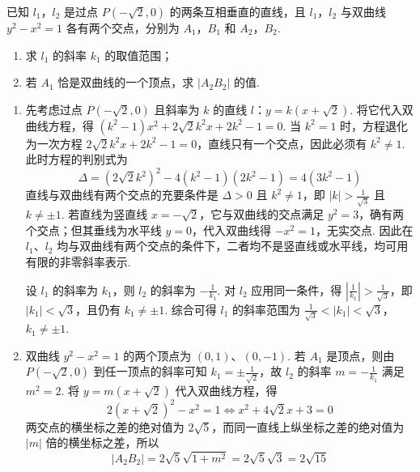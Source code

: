 \documentclass[UTF8,a4paper,oneside,11pt]{ctexbook}
\begin{document}
\begin{problem}
已知 \(l_{1}\)，\(l_{2}\) 是过点 \(P\left(-\sqrt{2}, 0\right)\) 的两条互相垂直的直线，且 \(l_{1}\)，\(l_{2}\) 与双曲线 \(y^{2}-x^{2}=1\) 各有两个交点，分别为 \(A_{1}\)，\(B_{1}\) 和 \(A_{2}\)，\(B_{2}\).

\begin{enumerate}
\item 求 \(l_{1}\) 的斜率 \(k_{1}\) 的取值范围；
\item 若 \(A_{1}\) 恰是双曲线的一个顶点，求 \(\left|A_{2}B_{2}\right|\) 的值.
\end{enumerate}
\end{problem}

\begin{solution}
\begin{enumerate}
\item 先考虑过点 \(P\left(-\sqrt{2},0\right)\) 且斜率为 \(k\) 的直线 \(l\)：\(y=k\left(x+\sqrt{2}\right)\). 将它代入双曲线方程，得 \(\left(k^2-1\right)x^2+2\sqrt{2}k^2x+2k^2-1=0\). 当 \(k^2=1\) 时，方程退化为一次方程 \(2\sqrt{2}k^2x+2k^2-1=0\)，直线只有一个交点，因此必须有 \(k^2\ne1\). 此时方程的判别式为
\[
\Delta=\left(2\sqrt{2}k^2\right)^2-4\left(k^2-1\right)\left(2k^2-1\right)=4\left(3k^2-1\right)
\]
直线与双曲线有两个交点的充要条件是 \(\Delta>0\) 且 \(k^2\ne1\)，即 \(|k|>\frac{1}{\sqrt{3}}\) 且 \(k\ne\pm1\). 若直线为竖直线 \(x=-\sqrt{2}\)，它与双曲线的交点满足 \(y^2=3\)，确有两个交点；但其垂线为水平线 \(y=0\)，代入双曲线得 \(-x^2=1\)，无实交点. 因此在 \(l_1\)、\(l_2\) 均与双曲线有两个交点的条件下，二者均不是竖直线或水平线，均可用有限的非零斜率表示.

设 \(l_1\) 的斜率为 \(k_1\)，则 \(l_2\) 的斜率为 \(-\frac{1}{k_1}\). 对 \(l_2\) 应用同一条件，得 \(\left|\frac{1}{k_1}\right|>\frac{1}{\sqrt{3}}\)，即 \(|k_1|<\sqrt{3}\)，且仍有 \(k_1\ne\pm1\). 综合可得 \(l_1\) 的斜率范围为
\(\frac{1}{\sqrt{3}}<|k_1|<\sqrt{3}\)，\(k_1\ne\pm1\).

\item 双曲线 \(y^2-x^2=1\) 的两个顶点为 \(\left(0,1\right)\)、\(\left(0,-1\right)\). 若 \(A_1\) 是顶点，则由 \(P\left(-\sqrt{2},0\right)\) 到任一顶点的斜率可知 \(k_1=\pm\frac{1}{\sqrt{2}}\)，故 \(l_2\) 的斜率 \(m=-\frac{1}{k_1}\) 满足 \(m^2=2\). 将 \(y=m\left(x+\sqrt{2}\right)\) 代入双曲线方程，得
\[
2\left(x+\sqrt{2}\right)^2-x^2=1\Longleftrightarrow x^2+4\sqrt{2}x+3=0
\]
两交点的横坐标之差的绝对值为 \(2\sqrt{5}\)，而同一直线上纵坐标之差的绝对值为 \(|m|\) 倍的横坐标之差，所以
\[
\left|A_2B_2\right|=2\sqrt{5}\sqrt{1+m^2}=2\sqrt{5}\sqrt{3}=2\sqrt{15}
\]
\end{enumerate}
\end{solution}

\end{document}
